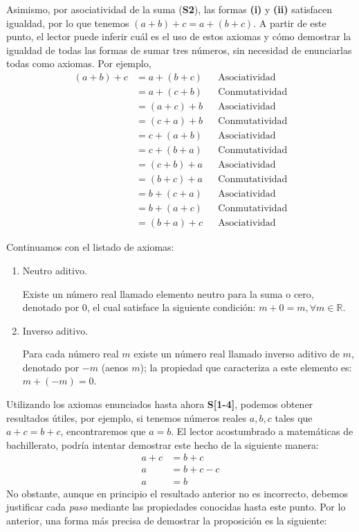 \documentclass[11pt]{article}
\newcommand{\R}{\mathbb{R}}
\begin{document}
Asimismo, por asociatividad de la suma (\textbf{S2}), las formas \textbf{(i)} y \textbf{(ii)} satisfacen igualdad, por lo que tenemos $(a+b)+c=a+(b+c)$. A partir de este punto, el lector puede inferir cuál es el uso de estos axiomas y cómo demostrar la igualdad de todas las formas de sumar tres números, sin necesidad de enunciarlas todas como axiomas. Por ejemplo, \begin{align*}
    (a+b)+c &= a+(b+c) && \text{Asociatividad}\\
    &= a+(c+b) && \text{Conmutatividad}\\
    &= (a+c)+b && \text{Asociatividad}\\
    &= (c+a)+b && \text{Conmutatividad}\\
    &= c+(a+b) && \text{Asociatividad}\\
    &= c+(b+a) && \text{Conmutatividad}\\
    &= (c+b)+a && \text{Asociatividad}\\
    &= (b+c)+a && \text{Conmutatividad}\\
    &= b+(c+a) && \text{Asociatividad}\\
    &= b+(a+c) && \text{Conmutatividad}\\
    &= (b+a)+c && \text{Asociatividad}
\end{align*}

Continuamos con el listado de axiomas:

\begin{enumerate}[start=3,label=S\arabic*.]
    \item Neutro aditivo.
    
    Existe un número real llamado elemento neutro para la suma o cero, denotado por $0$, el cual satisface la siguiente condición: $ m+0=m,\forall m \in \R $.
    \item Inverso aditivo.
    
    Para cada número real $m$ existe un número real llamado inverso aditivo de $m$, denotado por $-m$ (aenos $m$); la propiedad que caracteriza a este elemento es: $ m + (-m) = 0 $.
\end{enumerate}

Utilizando los axiomas enunciados hasta ahora \textbf{S[1-4]}, podemos obtener resultados útiles, por ejemplo, si tenemos números reales $a,b,c$ tales que $a+c=b+c$, encontraremos que $a=b$. El lector acostumbrado a matemáticas de bachillerato, podría intentar demostrar este hecho de la siguiente manera: \begin{align*}
    a+c &= b+c\\
    a &= b+c-c\\
    a &= b
\end{align*}
No obstante, aunque en principio el resultado anterior no es incorrecto, debemos justificar cada \textit{paso} mediante las propiedades conocidas hasta este punto. Por lo anterior, una forma más precisa de demostrar la proposición es la siguiente:
\end{document}
